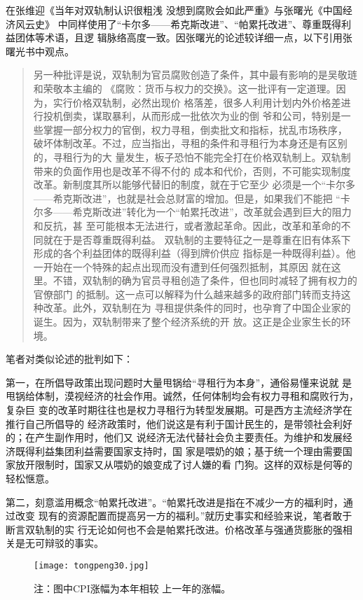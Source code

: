 在张维迎《当年对双轨制认识很粗浅 没想到腐败会如此严重》与张曙光《中国经济风云史》
中同样使用了“卡尔多——希克斯改进”、“帕累托改进”、尊重既得利益团体等术语，且逻
辑脉络高度一致。因张曙光的论述较详细一点，以下引用张曙光书中观点。
\begin{quotation}
另一种批评是说，双轨制为官员腐败创造了条件，其中最有影响的是吴敬琏和荣敬本主编的
《腐败：货币与权力的交换》。这一批评有一定道理。因为，实行价格双轨制，必然出现价
格落差，很多人利用计划内外价格差进行投机倒卖，谋取暴利，从而形成一批依次为业的倒
爷和公司，特别是一些掌握一部分权力的官倒，权力寻租，倒卖批文和指标，扰乱市场秩序，
破坏体制改革。不过，应当指出，寻租的条件和寻租行为本身还是有区别的，寻租行为的大
量发生，板子恐怕不能完全打在价格双轨制上。双轨制带来的负面作用也是改革不得不付的
成本和代价，否则，不可能实现制度改革。新制度其所以能够代替旧的制度，就在于它至少
必须是一个“卡尔多——希克斯改进”，也就是社会总财富的增加。但是，如果我们不能把
“卡尔多——希克斯改进”转化为一个“帕累托改进”，改革就会遇到巨大的阻力和反抗，甚
至可能根本无法进行，或者激起革命。因此，改革和革命的不同就在于是否尊重既得利益。
双轨制的主要特征之一是尊重在旧有体系下形成的各个利益团体的既得利益（得到牌价供应
指标是一种既得利益）。他一开始在一个特殊的起点出现而没有遭到任何强烈抵制，其原因
就在这里。不错，双轨制的确为官员寻租创造了条件，但也同时减轻了拥有权力的官僚部门
的抵制。这一点可以解释为什么越来越多的政府部门转而支持这种改革。此外，双轨制在为
寻租提供条件的同时，也孕育了中国企业家的诞生。因为，双轨制带来了整个经济系统的开
放。这正是企业家生长的环境。
\end{quotation}

笔者对类似论述的批判如下：

第一，在所倡导政策出现问题时大量甩锅给“寻租行为本身”，通俗易懂来说就
是甩锅给体制，漠视经济的社会作用。诚然，任何体制均会有权力寻租和腐败行为，复杂巨
变的改革时期往往也是权力寻租行为转型发展期。可是西方主流经济学在推行自己所倡导的
经济政策时，他们说这是有利于国计民生的，是带领社会利好的；在产生副作用时，他们又
说经济无法代替社会负主要责任。为维护和发展经济既得利益集团利益需要国家支持时，国
家是喂奶的娘；基于统一个理由需要国家放开限制时，国家又从喂奶的娘变成了讨人嫌的看
门狗。这样的双标是何等的轻松惬意。

第二，刻意滥用概念“帕累托改进”。“帕累托改进是指在不减少一方的福利时，通过改变
现有的资源配置而提高另一方的福利。”就历史事实和经验来说，笔者敢于断言双轨制的实
行无论如何也不会是帕累托改进。价格改革与强通货膨胀的强相关是无可辩驳的事实。

\begin{figure}[ht]
  \centering
  \texttt{[image: tongpeng30.jpg]}
  \caption[1980--2012年CPI通膨率]{\label{fig:tongpeng30}注：图中CPI涨幅为本年相较
    上一年的涨幅。 }
\end{figure}

